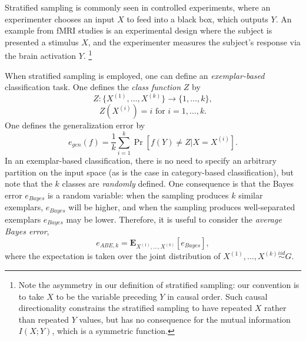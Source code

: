 \documentclass{article}
\newcommand{\E}{\textbf{E}}
\begin{document}
Stratified sampling is commonly seen in controlled experiments, where an experimenter
chooses an input $X$ to feed into a black box, which outputs $Y$.  An
example from fMRI studies is an experimental design where the subject
is presented a stimulus $X$, and the experimenter measures the
subject's response via the brain activation $Y$. \footnote{Note the
  asymmetry in our definition of stratified sampling: our convention
  is to take $X$ to be the variable preceding $Y$ in causal order.
  Such causal directionality constrains the stratified sampling to
  have repeated $X$ rather than repeated $Y$ values, but has no
  consequence for the mutual information $I(X; Y)$, which is a
  symmetric function.}

When stratified sampling is employed, one can
define an \emph{exemplar-based} classification task.
One defines the \emph{class function}
$Z$ by
\[
Z: \{X^{(1)}, \hdots, X^{(k)}\} \to \{1,\hdots, k\},
\]
\[
Z(X^{(i)}) = i\text{ for }i = 1, \hdots, k.
\]
One defines the generalization error by
\begin{equation}\label{egendef}
e_{gen}(f) = \frac{1}{k} \sum_{i=1}^k\Pr[f(Y) \neq Z|X = X^{(i)}].
\end{equation}
In an exemplar-based classification, there is no need to
specify an arbitrary partition on the input space (as is the case in category-based classification),
but note that the $k$ classes are \emph{randomly} defined.  One consequence is that
the Bayes error $e_{Bayes}$ is a random variable: when the sampling
produces $k$ similar exemplars, $e_{Bayes}$ will be higher, and when
the sampling produces well-separated exemplars $e_{Bayes}$ may be
lower.  Therefore, it is useful to consider
the \emph{average Bayes error},
\begin{equation}\label{abedef}
e_{ABE, k} = \E_{X^{(1)},\hdots, X^{(k)}}[e_{Bayes}],
\end{equation}
where the expectation is taken over the joint distribution of
$X^{(1)},\hdots, X^{(k)} \stackrel{iid}{\sim} G$.
\end{document}
